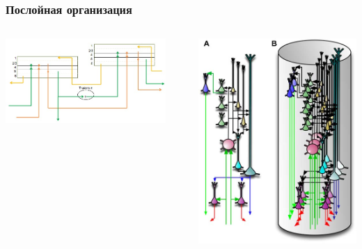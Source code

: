 \documentclass[default]{beamer}
\begin{document}
	\begin{frame}
		\frametitle{Послойная организация}
		
		\begin{columns}
			\begin{column}{0.65\textwidth}
				\includegraphics[width=0.9\textwidth]{mpf/regions_connect}
			\end{column}
			\begin{column}{0.35\textwidth}
				\includegraphics[width=\textwidth]{phisio/column}
			\end{column}
		\end{columns}
	\end{frame}
	
\end{document}
